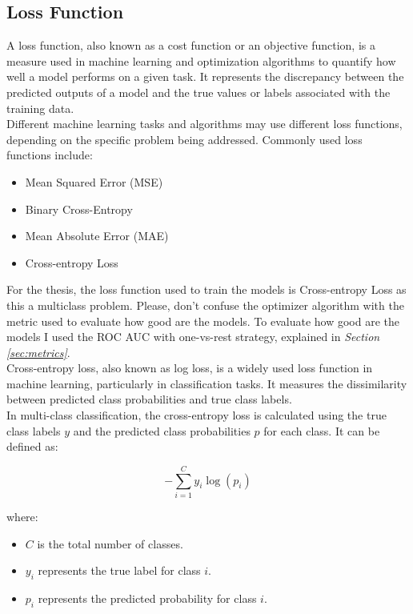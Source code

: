 \subsection{Loss Function}

A loss function, also known as a cost function or an objective function, is a measure used in machine learning and optimization algorithms to quantify how well a model performs on a given task. It represents the discrepancy between the predicted outputs of a model and the true values or labels associated with the training data. \\

Different machine learning tasks and algorithms may use different loss functions, depending on the specific problem being addressed. Commonly used loss functions include:

\begin{itemize}
    \item Mean Squared Error (MSE)
    \item Binary Cross-Entropy
    \item Mean Absolute Error (MAE)
    \item Cross-entropy Loss
\end{itemize}

For the thesis, the loss function used to train the models is Cross-entropy Loss as this a multiclass problem. Please, don't confuse the optimizer algorithm with the metric used to evaluate how good are the models. To evaluate how good are the models I used the ROC AUC with one-vs-rest strategy, explained in \textit{Section \ref{sec:metrics}}. \\

Cross-entropy loss, also known as log loss, is a widely used loss function in machine learning, particularly in classification tasks. It measures the dissimilarity between predicted class probabilities and true class labels. \\

In multi-class classification, the cross-entropy loss is calculated using the true class labels \(y\) and the predicted class probabilities \(p\) for each class. It can be defined as:

\[-\sum_{i=1}^{C} y_i \log(p_i)\]

\noindent where:

\begin{itemize}
    \item \(C\) is the total number of classes.
    \item \(y_i\) represents the true label for class \(i\).
    \item \(p_i\) represents the predicted probability for class \(i\).
\end{itemize}

